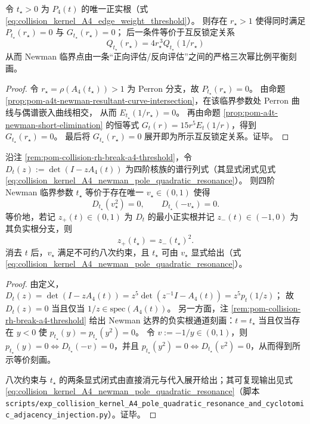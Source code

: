 \begin{proposition}\label{prop:pom-a4t-newman-reciprocal-locking}
令 \(t_\star>0\) 为 \(P_4(t)\) 的唯一正实根（式 \eqref{eq:collision_kernel_A4_edge_weight_threshold}）。
则存在 \(r_\star>1\) 使得同时满足 \(P_{t_\star}(r_\star)=0\) 与 \(G_{t_\star}(r_\star)=0\)；
后一条件等价于互反锁定关系
\[
\boxed{\;
Q_{t_\star}(r_\star)=4r_\star^{\,3}Q_{t_\star}(1/r_\star)\;}
\]
从而 Newman 临界点由一条“正向评估/反向评估”之间的严格三次幂比例平衡刻画。
\end{proposition}
\begin{proof}
令 \(r_\star=\rho(A_4(t_\star))>1\) 为 Perron 分支，故 \(P_{t_\star}(r_\star)=0\)。
由命题 \ref{prop:pom-a4t-newman-resultant-curve-intersection}，在该临界参数处 Perron 曲线与偶谱嵌入曲线相交，
从而 \(E_{t_\star}(1/r_\star)=0\)。
再由命题 \ref{prop:pom-a4t-newman-short-elimination} 的恒等式 \(G_t(r)=15r^5E_t(1/r)\)，得到 \(G_{t_\star}(r_\star)=0\)。
最后将 \(G_{t_\star}(r_\star)=0\) 展开即为所示互反锁定关系。证毕。
\end{proof}
\begin{proposition}[Newman 临界的极点二次共振刻画：\texorpdfstring{$D_t(v^2)=D_t(-v)=0$}{Dt(v^2)=Dt(-v)=0}]\label{prop:pom-a4t-newman-pole-quadratic-resonance}
沿注 \ref{rem:pom-collision-rh-break-a4-threshold}，令
\(
D_t(z):=\det(I-zA_4(t))
\)
为四阶核族的谱行列式（其显式闭式见式 \eqref{eq:collision_kernel_A4_newman_pole_quadratic_resonance}）。
则四阶 Newman 临界参数 \(t_\star\) 等价于存在唯一 \(v_\star\in(0,1)\) 使得
\[
D_{t_\star}(v_\star^2)=0,\qquad D_{t_\star}(-v_\star)=0.
\]
等价地，若记 \(z_+(t)\in(0,1)\) 为 \(D_t\) 的最小正实根并记 \(z_-(t)\in(-1,0)\) 为其负实根分支，则
\[
z_+(t_\star)=z_-(t_\star)^2.
\]
消去 \(t\) 后，\(v_\star\) 满足不可约八次约束，且 \(t_\star\) 可由 \(v_\star\) 显式给出（式 \eqref{eq:collision_kernel_A4_newman_pole_quadratic_resonance}）。
\end{proposition}
\begin{proof}
由定义，
\(
D_t(z)=\det(I-zA_4(t))=z^5\det(z^{-1}I-A_4(t))=z^5p_t(1/z)
\)；
故 \(D_t(z)=0\) 当且仅当 \(1/z\in\mathrm{spec}(A_4(t))\)。
另一方面，注 \ref{rem:pom-collision-rh-break-a4-threshold} 给出 Newman 达界的负实根通道刻画：\(t=t_\star\) 当且仅当存在 \(y<0\) 使 \(p_{t_\star}(y)=p_{t_\star}(y^2)=0\)。
令 \(v:=-1/y\in(0,1)\)，则 \(p_{t_\star}(y)=0\iff D_{t_\star}(-v)=0\)，并且 \(p_{t_\star}(y^2)=0\iff D_{t_\star}(v^2)=0\)，从而得到所示等价刻画。
\par
八次约束与 \(t_\star\) 的两条显式闭式由直接消元与代入展开给出；其可复现输出见式 \eqref{eq:collision_kernel_A4_newman_pole_quadratic_resonance}（脚本 \texttt{scripts/exp\_collision\_kernel\_A4\_pole\_quadratic\_resonance\_and\_cyclotomic\_adjacency\_injection.py}）。证毕。
\end{proof}

